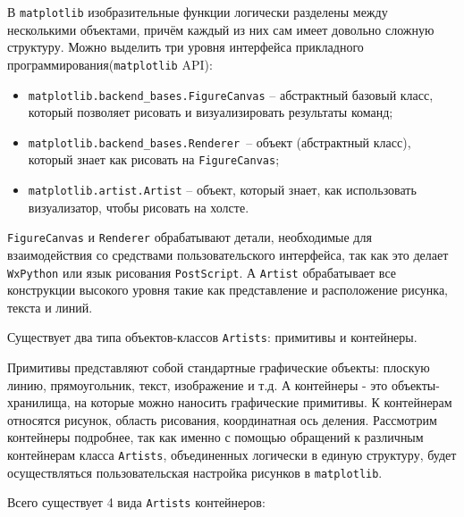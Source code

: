 В \lstinline!matplotlib! изобразительные функции логически разделены между несколькими объектами, причём каждый из них сам имеет довольно сложную структуру. Можно выделить три уровня интерфейса прикладного программирования(\lstinline!matplotlib! API):

\begin{itemize}
	\item  \lstinline!matplotlib.backend_bases.FigureCanvas! – абстрактный базовый класс, который позволяет рисовать и визуализировать результаты команд;
	\item  \lstinline!matplotlib.backend_bases.Renderer !– объект (абстрактный класс), который знает как рисовать на \lstinline!FigureCanvas!;
	\item  \lstinline!matplotlib.artist.Artist! – объект, который знает, как использовать визуализатор, чтобы рисовать на холсте.
\end{itemize}


\lstinline!FigureCanvas! и \lstinline!Renderer! обрабатывают детали, необходимые для взаимодействия со средствами пользовательского интерфейса, так как это делает \lstinline!WxPython! или язык рисования \lstinline!PostScript!. А \lstinline!Artist! обрабатывает все конструкции высокого уровня такие как представление и расположение рисунка, текста и линий.

Существует два типа объектов-классов \lstinline!Artists!: примитивы и контейнеры.

Примитивы представляют собой стандартные графические объекты: плоскую линию, прямоугольник, текст, изображение и т.д. А контейнеры - это объекты-хранилища, на которые можно наносить графические примитивы. К контейнерам относятся рисунок, область рисования, координатная ось деления. Рассмотрим контейнеры подробнее, так как именно с помощью обращений к различным контейнерам класса \lstinline!Artists!, объединенных логически в единую структуру, будет осуществляться пользовательская настройка рисунков в \lstinline!matplotlib!.

Всего существует 4 вида \lstinline!Artists! контейнеров:

